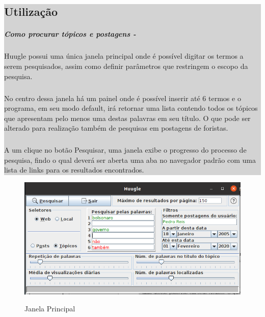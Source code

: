 \documentclass[a4paper,12pt,openany]{book}
\begin{document}
\colorbox{lightgrey}{
	
\begin{minipage}{18cm}
	
\chapter*{Utilização}

\paragraph{Como procurar tópicos e postagens -}
Huugle possui uma única janela principal onde é possível digitar os termos a serem pesquisados, assim como definir parâmetros que restringem o escopo da pesquisa.

\paragraph{}
No centro dessa janela há um painel onde é possível inserir até 6 termos e o programa, em seu modo default, irá retornar uma lista contendo todos os tópicos que apresentam pelo menos uma destas palavras em seu título. O que pode ser alterado para realização também de pesquisas em postagens de foristas.

\paragraph{}
A um clique no botão Pesquisar, uma janela exibe o progresso do processo de pesquisa, findo o qual deverá ser aberta uma aba no navegador padrão com uma lista de links para os resultados encontrados.



\end{minipage}



}%

\begin{figure}[h]
	\caption{Janela Principal}
	
	\centering %
	\includegraphics[width=15cm]{Figuras/janela-principal.png} %
	\label{figura:qualquernome}
\end{figure}
\end{document}
